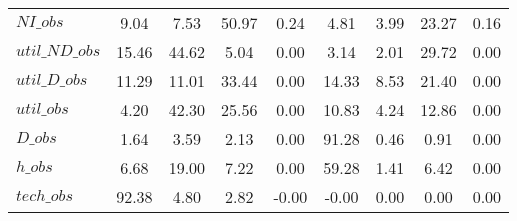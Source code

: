 \begin{center}
\begin{longtable}{lcccccccc}
$NI\_obs        $	 & 	         9.04	 & 	         7.53	 & 	        50.97	 & 	         0.24	 & 	         4.81	 & 	         3.99	 & 	        23.27	 & 	         0.16 \\ 
$util\_ND\_obs  $	 & 	        15.46	 & 	        44.62	 & 	         5.04	 & 	         0.00	 & 	         3.14	 & 	         2.01	 & 	        29.72	 & 	         0.00 \\ 
$util\_D\_obs   $	 & 	        11.29	 & 	        11.01	 & 	        33.44	 & 	         0.00	 & 	        14.33	 & 	         8.53	 & 	        21.40	 & 	         0.00 \\ 
$util\_obs      $	 & 	         4.20	 & 	        42.30	 & 	        25.56	 & 	         0.00	 & 	        10.83	 & 	         4.24	 & 	        12.86	 & 	         0.00 \\ 
$D\_obs         $	 & 	         1.64	 & 	         3.59	 & 	         2.13	 & 	         0.00	 & 	        91.28	 & 	         0.46	 & 	         0.91	 & 	         0.00 \\ 
$h\_obs         $	 & 	         6.68	 & 	        19.00	 & 	         7.22	 & 	         0.00	 & 	        59.28	 & 	         1.41	 & 	         6.42	 & 	         0.00 \\ 
$tech\_obs      $	 & 	        92.38	 & 	         4.80	 & 	         2.82	 & 	        -0.00	 & 	        -0.00	 & 	         0.00	 & 	         0.00	 & 	         0.00 \\ 
\end{longtable}
 \end{center}
